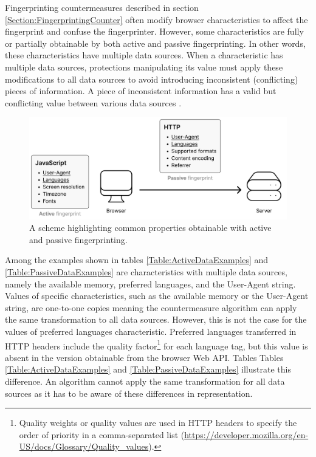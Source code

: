 Fingerprinting countermeasures described in section \ref{Section:FingerprintingCounter} often modify browser characteristics to affect the fingerprint and confuse the fingerprinter. However, some characteristics are fully or partially obtainable by both active and passive fingerprinting. In other words, these characteristics have multiple data sources. When a characteristic has multiple data sources, protections manipulating its value must apply these modifications to all data sources to avoid introducing inconsistent (conflicting) pieces of information. A piece of inconsistent information has a valid but conflicting value between various data sources \cite{VondracekDP}.

\begin{figure}[h]
    \centering
    \includegraphics[width=\textwidth]{obrazky-figures/inconsistencies_schema}
    \caption{A scheme highlighting common properties obtainable with active and passive fingerprinting.}
    \label{fig:mesh1}
\end{figure}

Among the examples shown in tables \ref{Table:ActiveDataExamples} and \ref{Table:PassiveDataExamples} are characteristics with multiple data sources, namely the available memory, preferred languages, and the User-Agent string. Values of specific characteristics, such as the available memory or the User-Agent string, are one-to-one copies meaning the countermeasure algorithm can apply the same transformation to all data sources. However, this is not the case for the values of preferred languages characteristic. Preferred languages transferred in HTTP headers include the quality factor\footnote{Quality weights or quality values are used in HTTP headers to specify the order of priority in a comma-separated list (\url{https://developer.mozilla.org/en-US/docs/Glossary/Quality_values}).} for each language tag, but this value is absent in the version obtainable from the browser Web API. Tables Tables \ref{Table:ActiveDataExamples} and \ref{Table:PassiveDataExamples} illustrate this difference. An algorithm cannot apply the same transformation for all data sources as it has to be aware of these differences in representation.

